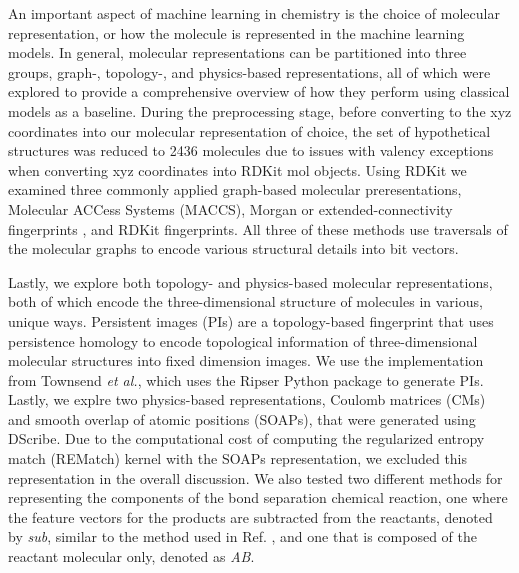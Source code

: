 \documentclass[journal=jacsat,manuscript=article]{achemso}
\begin{document}
An important aspect of machine learning in chemistry is the choice of molecular representation, or how the molecule is represented in the machine learning models.\cite{jones_molecular_2023}
In general, molecular representations can be partitioned into three groups, graph-, topology-, and physics-based representations, all of which were explored to provide a comprehensive overview of how they perform using classical models as a baseline.
During the preprocessing stage, before converting to the xyz coordinates into our molecular representation of choice, the set of hypothetical structures was reduced to 2436 molecules due to issues with valency exceptions when converting xyz coordinates into RDKit mol objects.
Using RDKit\cite{noauthor_rdkit_nodate} we examined three commonly applied graph-based molecular preresentations, Molecular ACCess Systems (MACCS)\cite{durant_reoptimization_2002}, Morgan or extended-connectivity fingerprints \cite{morgan_generation_1965,rogers_extended-connectivity_2010}, and RDKit fingerprints.
All three of these methods use traversals of the molecular graphs to encode various structural details into bit vectors.

Lastly, we explore both topology- and physics-based molecular representations, both of which encode the three-dimensional structure of molecules in various, unique ways.
Persistent images (PIs) are a topology-based fingerprint that uses persistence homology to encode topological information of three-dimensional molecular structures into fixed dimension images.\cite{adams_persistence_2017,townsend_representation_2020,schiff_augmenting_2022} 
We use the implementation from Townsend \textit{et al.}\cite{townsend_representation_2020}, which uses the Ripser Python package to generate PIs.\cite{tralie_ripserpy_2018}
Lastly, we explre two physics-based representations, Coulomb matrices (CMs) \cite{rupp_fast_2012} and smooth overlap of atomic positions (SOAPs), that were generated using DScribe.\cite{de_comparing_2016}
Due to the computational cost of computing the regularized entropy match (REMatch) kernel  with the SOAPs representation, we excluded this representation in the overall discussion.
We  also tested two different methods for representing the components of the bond separation chemical reaction, one where the feature vectors for the products are subtracted from the reactants, denoted by \textit{sub}, similar to the method used in Ref. \cite{garcia-andrade_barrier_2023}, and one that is composed of the reactant molecular only, denoted as \textit{AB}.
\end{document}
